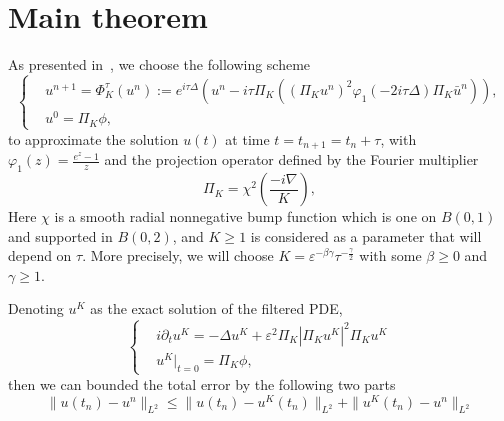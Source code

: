 \documentclass[10pt,a4paper]{article}
\begin{document}
  \section{Main theorem}
  As presented in~\cite{ORS21}, we choose the following scheme
  \begin{equation}\label{num-sol} %
    \left\{
    \begin{aligned}
      & u^{n+1} = \Phi_K^{\tau}(u^n) := e^{i\tau\Delta} \left( u^n - i\tau\Pi_K
      \left( {(\Pi_K u^n)}^2 \varphi_1(-2i\tau\Delta)\Pi_K \bar{u}^n \right) \right), \\
      & u^0 = \Pi_K \phi,
    \end{aligned}
    \right.
  \end{equation}
  to approximate the solution \(u(t)\) at time \( t = t_{n+1} = t_n + \tau \),
  with \( \varphi_1(z) = \frac{e^z-1}{z} \) and the projection operator defined
  by the Fourier multiplier
  \begin{equation}
    \Pi_K = \chi^2 \left( \frac{-i\nabla}{K} \right),
  \end{equation}
  Here \(\chi\) is a smooth radial nonnegative bump function which is one on \(
  B(0,1) \) and supported in \( B(0,2) \), and \( K \geq 1 \) is considered as a
  parameter that will depend on \(\tau\). More precisely, we will choose \( K =
  \varepsilon^{-\beta\gamma}\tau^{-\frac\gamma2} \) with some \(\beta \geq 0\) and 
  \(\gamma \geq 1\).  

  Denoting \(u^K\) as the exact solution of the filtered PDE,
  \begin{equation}\label{nls-fil} %
    \left\{
    \begin{aligned}
      & i\partial_t u^K = -\Delta u^K + \varepsilon^2 \Pi_K|\Pi_K u^K|^2 \Pi_K u^K \\
      & u^K|_{t=0} = \Pi_K\phi,
    \end{aligned}
    \right.
  \end{equation}
  then we can bounded the total error by the following two parts
  \begin{equation}\label{seperr}
    \| u(t_n) - u^n \|_{L^2} \leq \| u(t_n) - u^K(t_n) \|_{L^2} + 
    \| u^K(t_n) - u^n \|_{L^2}
  \end{equation}

  
\end{document}
